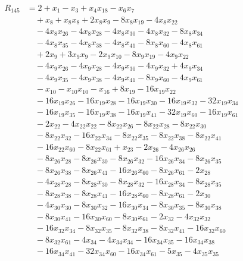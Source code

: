 \begin{align*}
R_{145}&={}2 +x_{1} -x_{3} +x_{4}x_{18} -x_{6}x_{7}\\
&\quad{}+x_{8} +x_{8}x_{8} +2x_{8}x_{9} -8x_{8}x_{19} -4x_{8}x_{22}\\
&\quad{}-4x_{8}x_{26} -4x_{8}x_{28} -4x_{8}x_{30} -4x_{8}x_{32} -8x_{8}x_{34}\\
&\quad{}-4x_{8}x_{35} -4x_{8}x_{38} -4x_{8}x_{41} -8x_{8}x_{60} -4x_{8}x_{61}\\
&\quad{}+2x_{9} +3x_{9}x_{9} -2x_{9}x_{10} -8x_{9}x_{19} -4x_{9}x_{22}\\
&\quad{}-4x_{9}x_{26} -4x_{9}x_{28} -4x_{9}x_{30} -4x_{9}x_{32} +4x_{9}x_{34}\\
&\quad{}-4x_{9}x_{35} -4x_{9}x_{38} -4x_{9}x_{41} -8x_{9}x_{60} -4x_{9}x_{61}\\
&\quad{}-x_{10} -x_{10}x_{10} -x_{16} +8x_{19} -16x_{19}x_{22}\\
&\quad{}-16x_{19}x_{26} -16x_{19}x_{28} -16x_{19}x_{30} -16x_{19}x_{32} -32x_{19}x_{34}\\
&\quad{}-16x_{19}x_{35} -16x_{19}x_{38} -16x_{19}x_{41} -32x_{19}x_{60} -16x_{19}x_{61}\\
&\quad{}-2x_{22} -4x_{22}x_{22} -8x_{22}x_{26} -8x_{22}x_{28} -8x_{22}x_{30}\\
&\quad{}-8x_{22}x_{32} -16x_{22}x_{34} -8x_{22}x_{35} -8x_{22}x_{38} -8x_{22}x_{41}\\
&\quad{}-16x_{22}x_{60} -8x_{22}x_{61} +x_{23} -2x_{26} -4x_{26}x_{26}\\
&\quad{}-8x_{26}x_{28} -8x_{26}x_{30} -8x_{26}x_{32} -16x_{26}x_{34} -8x_{26}x_{35}\\
&\quad{}-8x_{26}x_{38} -8x_{26}x_{41} -16x_{26}x_{60} -8x_{26}x_{61} -2x_{28}\\
&\quad{}-4x_{28}x_{28} -8x_{28}x_{30} -8x_{28}x_{32} -16x_{28}x_{34} -8x_{28}x_{35}\\
&\quad{}-8x_{28}x_{38} -8x_{28}x_{41} -16x_{28}x_{60} -8x_{28}x_{61} -2x_{30}\\
&\quad{}-4x_{30}x_{30} -8x_{30}x_{32} -16x_{30}x_{34} -8x_{30}x_{35} -8x_{30}x_{38}\\
&\quad{}-8x_{30}x_{41} -16x_{30}x_{60} -8x_{30}x_{61} -2x_{32} -4x_{32}x_{32}\\
&\quad{}-16x_{32}x_{34} -8x_{32}x_{35} -8x_{32}x_{38} -8x_{32}x_{41} -16x_{32}x_{60}\\
&\quad{}-8x_{32}x_{61} -4x_{34} -4x_{34}x_{34} -16x_{34}x_{35} -16x_{34}x_{38}\\
&\quad{}-16x_{34}x_{41} -32x_{34}x_{60} -16x_{34}x_{61} -5x_{35} -4x_{35}x_{35}\\

\end{align*}
